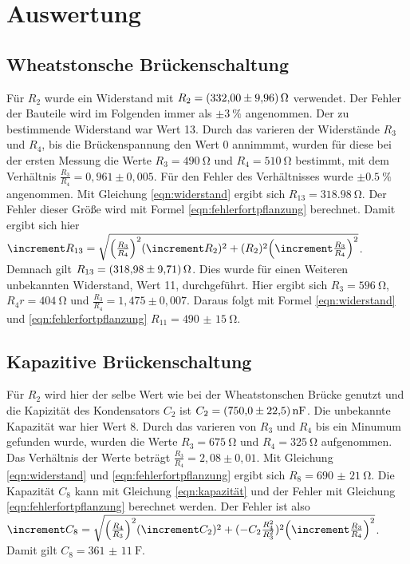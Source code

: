 \section{Auswertung}
\label{sec:Auswertung}

\subsection{Wheatstonsche Brückenschaltung}
Für $R_2$ wurde ein Widerstand mit $R_2=\qty{332(9,96)}{\ohm}$ verwendet.
Der Fehler der Bauteile wird im Folgenden immer als $\pm\qty{3}{\percent}$ angenommen.
Der zu bestimmende Widerstand war Wert 13.
Durch das varieren der Widerstände $R_3$ und $R_4$, bis die Brückenspannung den Wert 0 annimmmt, wurden für diese bei der ersten Messung die Werte
$R_3=\qty{490}{\ohm}$ und $R_4=\qty{510}{\ohm}$ bestimmt, mit dem Verhältnis $\frac{R_3}{R_4}=0,961\pm0,005$.
Für den Fehler des Verhältnisses wurde $\pm\qty{0,5}{\percent}$ angenommen.
Mit Gleichung \ref{eqn:widerstand} ergibt sich $R_{13}=\qty{318,98}{\ohm}$.
Der Fehler dieser Größe wird mit Formel \ref{eqn:fehlerfortpflanzung} berechnet.
Damit ergibt sich hier $\increment R_{13}=\sqrt{ \Bigl(\frac{R_3}{R_4}\Bigr)^2 (\increment R_2)^2+(R_2)^2 \Bigl(\increment \frac{R_3}{R_4}\Bigr)^2}$.
Demnach gilt $R_{13}=\qty{318,98(9,71)}{\ohm}$.
Dies wurde für einen Weiteren unbekannten Widerstand, Wert 11, durchgeführt.
Hier ergibt sich $R_3=\qty{596}{\ohm}$, $R_4r=\qty{404}{\ohm}$ und $\frac{R_3}{R_4}=1,475\pm0,007$.
Daraus folgt mit Formel \ref{eqn:widerstand} und \ref{eqn:fehlerfortpflanzung} $R_{11}=\qty{490(15)}{\ohm}$.

\subsection{Kapazitive Brückenschaltung}
Für $R_2$ wird hier der selbe Wert wie bei der Wheatstonschen Brücke genutzt und die Kapizität des Kondensators $C_2$ ist $C_2=\qty{750(22,5)}{\nano\farad}$.
Die unbekannte Kapazität war hier Wert 8.
Durch das varieren von $R_3$ und $R_4$ bis ein Minumum gefunden wurde, wurden die Werte $R_3=\qty{675}{\ohm}$ und $R_4=\qty{325}{\ohm}$ aufgenommen.
Das Verhältnis der Werte beträgt $\frac{R_3}{R_4}=2,08\pm0,01$. 
Mit Gleichung \ref{eqn:widerstand} und \ref{eqn:fehlerfortpflanzung} ergibt sich $R_8=\qty{690(21)}{\ohm}$.
Die Kapazität $C_8$ kann mit Gleichung \ref{eqn:kapazität} und der Fehler mit Gleichung \ref{eqn:fehlerfortpflanzung} berechnet werden.
Der Fehler ist also $\increment C_{8}=\sqrt{ \Bigl(\frac{R_4}{R_3}\Bigr)^2 (\increment C_2)^2+(-C_2 \frac{R_4^2}{R_3^2})^2 \Bigl(\increment \frac{R_3}{R_4}\Bigr)^2}$.
Damit gilt $C_8=\qty{361(11)}{\farad}$.\\

